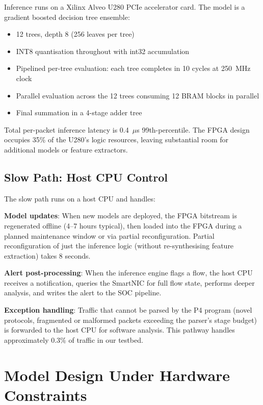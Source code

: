 \documentclass[sigconf,nonacm]{acmart}
\begin{document}
Inference runs on a Xilinx Alveo U280 PCIe accelerator card. The model
is a gradient boosted decision tree ensemble:

\begin{itemize}
  \item 12 trees, depth 8 (256 leaves per tree)
  \item INT8 quantisation throughout with int32 accumulation
  \item Pipelined per-tree evaluation: each tree completes in 10
        cycles at 250~MHz clock
  \item Parallel evaluation across the 12 trees consuming 12 BRAM
        blocks in parallel
  \item Final summation in a 4-stage adder tree
\end{itemize}

Total per-packet inference latency is 0.4~$\mu$s 99th-percentile. The
FPGA design occupies 35\% of the U280's logic resources, leaving
substantial room for additional models or feature extractors.

\subsection{Slow Path: Host CPU Control}

The slow path runs on a host CPU and handles:

\textbf{Model updates}: When new models are deployed, the FPGA bitstream
is regenerated offline (4--7 hours typical), then loaded into the FPGA
during a planned maintenance window or via partial reconfiguration.
Partial reconfiguration of just the inference logic (without
re-synthesising feature extraction) takes 8 seconds.

\textbf{Alert post-processing}: When the inference engine flags a flow,
the host CPU receives a notification, queries the SmartNIC for full
flow state, performs deeper analysis, and writes the alert to the
SOC pipeline.

\textbf{Exception handling}: Traffic that cannot be parsed by the P4
program (novel protocols, fragmented or malformed packets exceeding
the parser's stage budget) is forwarded to the host CPU for software
analysis. This pathway handles approximately 0.3\% of traffic in our
testbed.

\section{Model Design Under Hardware Constraints}
\end{document}
